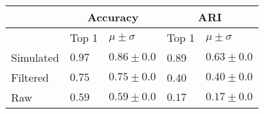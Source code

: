 \begin{tabular}{lllll}
\toprule
{} & \multicolumn{2}{c}{Accuracy} &   \multicolumn{2}{c}{ARI} \\
\midrule
{} & Top 1 & $\mu \pm \sigma$ &  Top 1 & $\mu \pm \sigma$ \\
Simulated &  $0.97$ & $0.86 \pm 0.0 $ &  0.89 & $0.63 \pm 0.0 $ \\
Filtered  &   $0.75$  & $0.75 \pm 0.0$ &  0.40 & $0.40 \pm 0.0$ \\
Raw &   $0.59$ &  $0.59\pm 0.0$ & $0.17$ & $0.17\pm 0.0$ \\
\bottomrule
\end{tabular}
